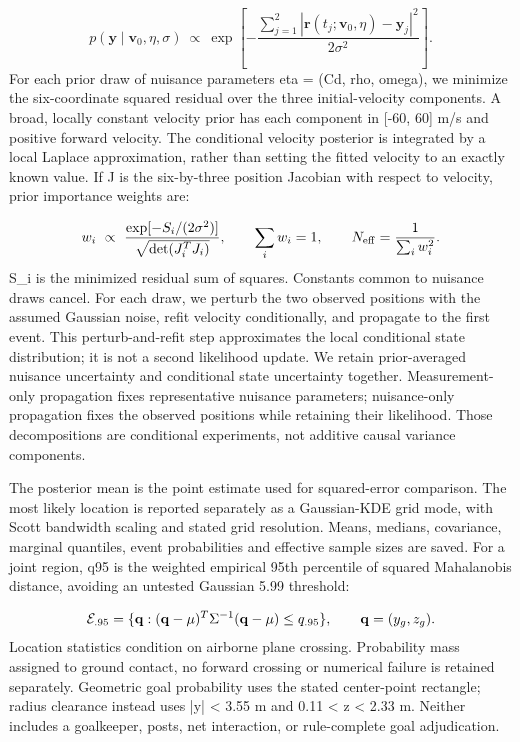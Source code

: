 \documentclass[11pt,a4paper]{article}
\begin{document}
\begin{equation}
p(\mathbf{y}\mid\mathbf{v}_0,\eta,\sigma)\ \propto\ \exp\left[-\frac{\sum_{j=1}^2|\mathbf{r}(t_j;\mathbf{v}_0,\eta)-\mathbf{y}_j|^2}{2\sigma^2}\right].
\end{equation}
For each prior draw of nuisance parameters eta = (Cd, rho, omega), we minimize the six-coordinate squared residual over the three initial-velocity components. A broad, locally constant velocity prior has each component in [-60, 60] m/s and positive forward velocity. The conditional velocity posterior is integrated by a local Laplace approximation, rather than setting the fitted velocity to an exactly known value. If J is the six-by-three position Jacobian with respect to velocity, prior importance weights are:

\begin{equation}
w_i\ \propto\ \frac{\exp[-S_i/(2\sigma^2)]}{\sqrt{\det(J_i^{T}J_i)}},\qquad \sum_i w_i=1,\qquad N_{\rm eff}=\frac{1}{\sum_i w_i^2}.
\end{equation}
S\_i is the minimized residual sum of squares. Constants common to nuisance draws cancel. For each draw, we perturb the two observed positions with the assumed Gaussian noise, refit velocity conditionally, and propagate to the first event. This perturb-and-refit step approximates the local conditional state distribution; it is not a second likelihood update. We retain prior-averaged nuisance uncertainty and conditional state uncertainty together. Measurement-only propagation fixes representative nuisance parameters; nuisance-only propagation fixes the observed positions while retaining their likelihood. Those decompositions are conditional experiments, not additive causal variance components.

The posterior mean is the point estimate used for squared-error comparison. The most likely location is reported separately as a Gaussian-KDE grid mode, with Scott bandwidth scaling and stated grid resolution. Means, medians, covariance, marginal quantiles, event probabilities and effective sample sizes are saved. For a joint region, q95 is the weighted empirical 95th percentile of squared Mahalanobis distance, avoiding an untested Gaussian 5.99 threshold:

\begin{equation}
{\cal E}_{.95}=\{\mathbf{q}:(\mathbf{q}-\mu)^T\Sigma^{-1}(\mathbf{q}-\mu)\leq q_{.95}\},\qquad \mathbf{q}=(y_g,z_g).
\end{equation}
Location statistics condition on airborne plane crossing. Probability mass assigned to ground contact, no forward crossing or numerical failure is retained separately. Geometric goal probability uses the stated center-point rectangle; radius clearance instead uses |y| < 3.55 m and 0.11 < z < 2.33 m. Neither includes a goalkeeper, posts, net interaction, or rule-complete goal adjudication.
\end{document}
